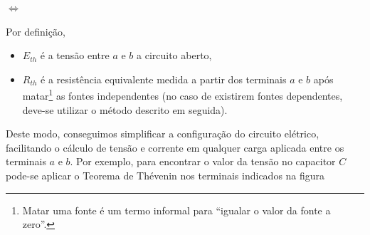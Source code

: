 \documentclass{article}
\numberwithin{equation}{section}
\newlength\Colsep
\begin{document}
\noindent\begin{minipage}{\textwidth}
\begin{minipage}[c][4cm][c]{\dimexpr0.45\textwidth-0.5\Colsep\relax}
    \begin{center}
\end{center}
\end{minipage}
\begin{minipage}[c][4cm][c]{\dimexpr0.1\textwidth-0.5\Colsep\relax}
    $\iff$
\end{minipage}
\begin{minipage}[c][4cm][c]{\dimexpr0.45\textwidth-0.5\Colsep\relax}
    \begin{center}
\end{center}
\end{minipage}
\end{minipage}

Por definição,
\begin{itemize}
    \item $E_{th}$ é a tensão entre $a$ e $b$ a circuito aberto,
    \item $R_{th}$ é a resistência equivalente medida a partir dos terminais $a$ e $b$ após matar\footnote{Matar uma fonte é um termo informal para ``igualar o valor da fonte a zero''.} as fontes independentes (no caso de existirem fontes dependentes, deve-se utilizar o método descrito em seguida).
\end{itemize}

Deste modo, conseguimos simplificar a configuração do circuito elétrico, facilitando o cálculo de tensão e corrente em qualquer carga aplicada entre os terminais $a$ e $b$. Por exemplo, para encontrar o valor da tensão no capacitor $C$ pode-se aplicar o Teorema de Thévenin nos terminais indicados na figura
\end{document}
